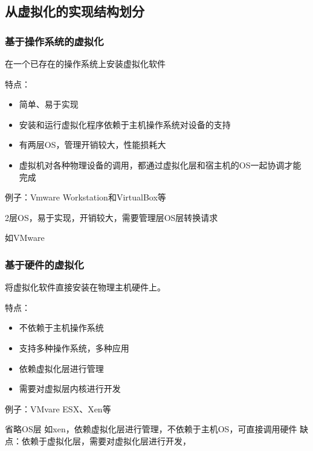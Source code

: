 \subsection{从虚拟化的实现结构划分}

\subsubsection{基于操作系统的虚拟化}
\begin{definition}[基于操作系统的虚拟化]
    在一个已存在的操作系统上安装虚拟化软件

    特点：
    
    \begin{itemize}
        \item 简单、易于实现
        \item 安装和运行虚拟化程序依赖于主机操作系统对设备的支持
        \item 有两层OS，管理开销较大，性能损耗大
        \item 虚拟机对各种物理设备的调用，都通过虚拟化层和宿主机的OS一起协调才能完成
    \end{itemize}

    例子：Vmware Workstation和VirtualBox等
\end{definition}

2层OS，易于实现，开销较大，需要管理层OS层转换请求 

如VMware

\subsubsection{基于硬件的虚拟化}

\begin{definition}[基于硬件的虚拟化]
    将虚拟化软件直接安装在物理主机硬件上。

    特点：
    \begin{itemize}
        \item 不依赖于主机操作系统
        \item 支持多种操作系统，多种应用
        \item 依赖虚拟化层进行管理
        \item 需要对虚拟层内核进行开发
    \end{itemize}

例子：VMvare ESX、Xen等
\end{definition}

省略OS层 如xen，依赖虚拟化层进行管理，不依赖于主机OS，可直接调用硬件 缺点：依赖于虚拟化层，需要对虚拟化层进行开发， 

